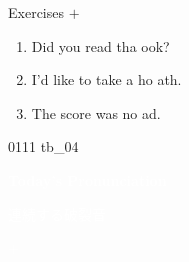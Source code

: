 \documentclass[aspectratio=169,xcolor={dvipsnames,table}]{beamer}
\begin{document}
\begin{frame}[plain]{Exercises  $+$ }
  \Large
  \begin{enumerate}
    \item<2-> Did you read tha \hspace{-2pt} ook?
    \item<4-> I'd like to take a ho  ath.
    \item<6-> The score was no  ad.
  \end{enumerate}

  \hfill{\tiny 0111}\,{\scriptsize {}\,tb\_04}

\end{frame}
\begin{frame}
  \hypertarget{today}{}
  \centering
  \textcolor{white}{\Huge\bfseries Today's Pronunciation}

  \vspace{30pt}

  \textcolor{white}{\Large 連続する破裂音}

  \textcolor{white}{\Large {} $+$ }
\end{frame}
\end{document}
